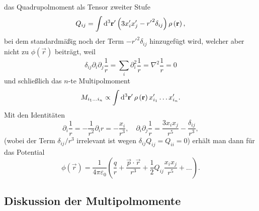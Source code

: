 das Quadrupolmoment als Tensor zweiter Stufe
\begin{equation*}
	Q_{ij}=\int \diffa[3]{\vec{r}'}\left(3x_{i}'x_{j}'-{r'}^{2}\delta _{ij}\right)\rho \left(\vec {r}\right),
\end{equation*}
bei dem standardmäßig noch der Term $-{r'}^{2}\delta _{ij}$ hinzugefügt wird, welcher aber nicht zu $\phi(\vec r) $ beiträgt, weil
\begin{equation*}
	\delta _{ij}\partial _{i}\partial _{j}\frac{1}{r}=\sum _{i}\partial _{i}^{2}\frac{1}{r}=\nabla ^{2}\frac{1}{r}=0
\end{equation*}
und schließlich das $n$-te Multipolmoment
\begin{equation*}
	M_{{i_{1}}\ldots {i_{n}}}\propto \int \diffa[3]{\vec{r}'}\rho \left(\vec {r}\right)x_{i_{1}}'\ldots x_{i_{n}}'.
\end{equation*}
Mit den Identitäten
\begin{equation*}
	\partial _{i}\frac{1}{r}=-\frac{1}{r^{2}}\partial _{i}r=-\frac{x_{i}}{r^{3}},\quad \partial _{i}\partial _{j}\frac{1}{r}=\frac{3x_{i}x_{j}}{r^{5}}-\frac{\delta _{ij}}{r^{3}},
\end{equation*}
(wobei der Term $\delta_{ij}/r^3$ irrelevant ist wegen $\delta _{ij}Q_{ij}=Q_{ii}=0$) erhält man dann für das Potential
\begin{equation*}
	\phi \left(\vec {r}\right)=\frac{1}{4\pi \varepsilon _{0}}\left(\frac{q}{r}+\frac{\vec {p}\cdot \vec {r}}{r^{3}}+\frac{1}{2}Q_{ij}\frac{x_{i}x_{j}}{r^{5}}+\ldots \right).
\end{equation*}



\subsection{Diskussion der Multipolmomente}

